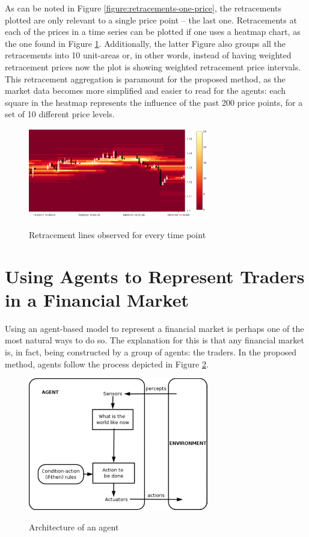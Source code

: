 As can be noted in Figure \ref{figure:retracements-one-price}, the retracements
plotted are only relevant to a single price point -- the last one. Retracements
at each of the prices in a time series can be plotted if one uses a heatmap
chart, as the one found in Figure
\ref{figure:retracements-all-prices}. Additionally, the latter Figure also
groups all the retracements into 10 unit-areas or, in other words, instead of
having weighted retracement prices now the plot is showing weighted retracement
price intervals. This retracement aggregation is paramount for the proposed
method, as the market data becomes more simplified and easier to read for the
agents: each square in the heatmap represents the influence of the past 200
price points, for a set of 10 different price levels.

\begin{figure}
\caption{Retracement lines observed for every time point} \centering
\includegraphics[width=0.7\textwidth]{img/retracements-preprocessing-all-prices.png}
\label{figure:retracements-all-prices}
\end{figure}

\section{Using Agents to Represent Traders in a Financial Market}
\label{section:using-agents-to-represent-traders-in-a-financial-market}

Using an agent-based model to represent a financial market is perhaps one of the
most natural ways to do so. The explanation for this is that any financial
market is, in fact, being constructed by a group of agents: the traders. In the
proposed method, agents follow the process depicted in Figure
\ref{figure:agent-architecture}.

\begin{figure}
\caption{Architecture of an agent} \centering
\includegraphics[width=0.7\textwidth]{img/agent-architecture.png}
\label{figure:agent-architecture}
\end{figure}

